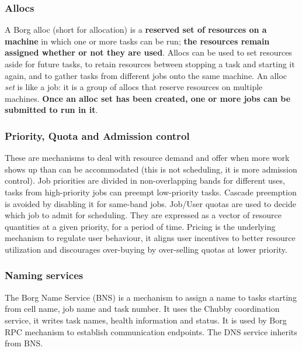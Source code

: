 		\subsubsection{Allocs}
		A Borg alloc (short for allocation) is a \textbf{reserved set of resources on a machine} in which one or more tasks can be run; \textbf{the resources remain assigned whether or not they are
		used}.\newline
		Allocs can be used to set resources aside for future	tasks, to retain resources between stopping a task and starting it again, and to gather tasks from different jobs onto the	same machine.\newline
		An alloc \textit{set} is like a job: it is a group of allocs that reserve resources on multiple machines. \textbf{Once an alloc set has been created, one or more jobs can be submitted to run in it}.
		\subsubsection{Priority, Quota and Admission control}
		These are mechanisms to deal with resource demand and offer when more work shows up than can be accommodated (this is not scheduling, it is more admission control).\newline
		Job priorities are divided in non-overlapping bands for different uses, tasks from high-priority jobs can preempt low-priority tasks. Cascade preemption is avoided by disabling it for same-band jobs.\newline
		\newline
		Job/User quotas are used to decide which job to admit for scheduling. They are expressed as a vector of resource quantities at a given priority, for a period of time.\newline
		Pricing is the underlying mechanism to regulate user behaviour, it aligns user incentives to better resource utilization and discourages over-buying by over-selling quotas at lower priority.
		\subsubsection{Naming services}
		The Borg Name Service (BNS) is a mechanism to assign a name to tasks starting from cell name, job name and task number.\newline
		It uses the Chubby coordination service, it writes task names, health information and status. It is used by Borg RPC mechanism to establish communication	endpoints.\newline
		The DNS service inherits from BNS.
